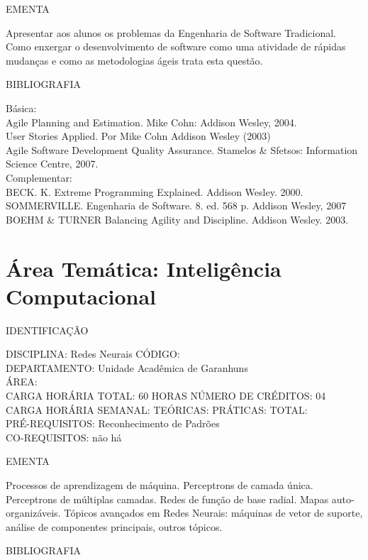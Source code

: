\documentclass[
	12pt,				%
	openright,			%
  oneside,     %
	a4paper,			%
	english,			%
	french,				%
	spanish,			%
	brazil				%
	]{abntex2}
\begin{document}
\begin{apendicesenv}
EMENTA 

Apresentar aos alunos os problemas da Engenharia de Software
Tradicional. Como enxergar o desenvolvimento de software como uma
atividade de rápidas mudanças e como as metodologias ágeis trata esta
questão.

BIBLIOGRAFIA 

Básica:\\
Agile Planning and Estimation. Mike Cohn: Addison Wesley, 2004.\\
User Stories Applied. Por Mike Cohn  Addison Wesley (2003)\\
Agile Software Development Quality Assurance. Stamelos \& Sfetsos:
Information Science Centre, 2007.\\
Complementar:\\
BECK. K. Extreme Programming Explained. Addison Wesley. 2000.\\
SOMMERVILLE. Engenharia de Software. 8. ed. 568 p. Addison Wesley, 2007\\
BOEHM \& TURNER Balancing Agility and Discipline. Addison Wesley. 2003.
\newpage 

\section*{Área Temática: Inteligência Computacional}

IDENTIFICAÇÃO

DISCIPLINA: Redes Neurais CÓDIGO:\\ 
DEPARTAMENTO: Unidade Acadêmica de Garanhuns\\
ÁREA: \\
CARGA HORÁRIA TOTAL: 60 HORAS NÚMERO DE CRÉDITOS: 04\\
CARGA HORÁRIA SEMANAL: TEÓRICAS: PRÁTICAS: TOTAL: \\
PRÉ-REQUISITOS: Reconhecimento de Padrões\\
CO-REQUISITOS: não há

EMENTA 

Processos de aprendizagem de máquina. Perceptrons de camada única.
Perceptrons de múltiplas camadas. Redes de função de base radial. Mapas
auto-organizáveis. Tópicos avançados em Redes Neurais: máquinas de
vetor de suporte, análise de componentes principais, outros tópicos.

BIBLIOGRAFIA 


\end{apendicesenv}
\end{document}
